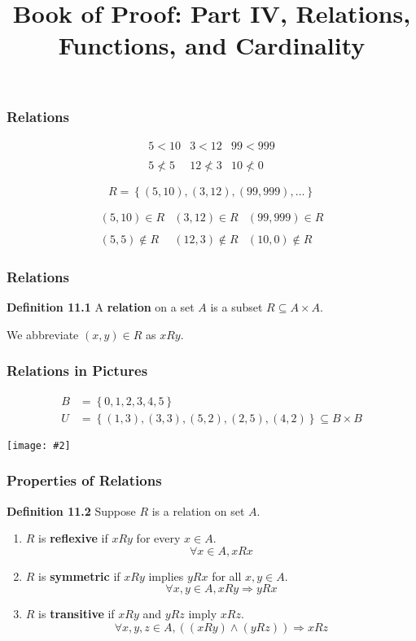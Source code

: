 \documentclass{beamer}
\title{Book of Proof: Part IV, Relations, Functions, and Cardinality}
\newcommand{\set}[1]{\ensuremath{\left\{ #1 \right\}}}
\newcommand{\then}{\ensuremath{\Rightarrow}}
\newcommand{\grf}[2]{\centerline{\texttt{[image: \#2]}}}
\newcommand{\bfr}[1]{\begin{frame}[fragile]\frametitle{{ #1 }}}
\begin{document}
\begin{frame}
\maketitle

\end{frame}

\bfr{Relations}
\[
\begin{array}{ccc}
  5 < 10 & 3 < 12 & 99 < 999 \\\\
  5 \not< 5 & 12\not< 3 & 10 \not< 0
\end{array}
\]

\pause\vfill
\[ R = \set{(5,10), (3,12), (99,999), \ldots} \]

\[
\begin{array}{ccc}
  (5,10)\in R & (3,12)\in R & (99,999)\in R \\\\
  (5,5) \not\in R & (12,3) \not\in R & (10,0)\not\in R
\end{array}
\]


\end{frame}

\bfr{Relations}

{\bf Definition 11.1}  A {\bf relation} on a set $A$ is a subset
$R\subseteq A\times A$.

We abbreviate $(x,y)\in R$ as $xRy$.

\end{frame}


\bfr{Relations in Pictures}

\begin{align*}
  B &=\set{0,1,2,3,4,5} \\
 U &= \set{
  (1,3), (3,3), (5,2), (2,5), (4,2)
} \subseteq B\times B
\end{align*}

\grf{0.5}{relationUonB.png}

\end{frame}

\bfr{Properties of Relations}

{\bf Definition 11.2}  Suppose $R$ is a relation on set $A$.

\begin{enumerate}
\item  $R$ is {\bf reflexive} if $xRy$ for every $x\in A$.
  \[ \forall x\in A, xRx \]

\item $R$ is {\bf symmetric} if $xRy$ implies $yRx$ for all
  $x,y\in A$.
  \[ \forall x,y \in A, xRy \then yRx \]

\item $R$ is {\bf transitive} if $xRy$ and $yRz$ imply $xRz$.
  \[
  \forall x,y,z\in A, ((xRy) \land (yRz)) \then xRz
  \]
\end{enumerate}
\end{frame}
\end{document}
